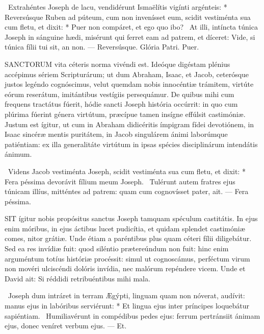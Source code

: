 \R\ Extrahéntes Joseph de lacu, vendidérunt Ismaëlítis vigínti argénteis: * Reversúsque Ruben ad púteum, cum non invenísset eum, scidit vestiménta sua cum fletu, et dixit: * Puer non compáret, et ego quo ibo? \V\ At illi, intíncta túnica Joseph in sánguine hædi, misérunt qui ferret eam ad patrem, et díceret: Vide, si túnica fílii tui sit, an non. --- Reversúsque. Glória Patri. Puer.




\lettrine[lines=2]{S}{ANCTORUM} vita céteris norma vivéndi est. Ideóque digéstam plénius accépimus sériem Scripturárum; ut dum Abraham, Isaac, et Jacob, ceterósque justos legéndo cognóscimus, velut quemdam nobis innocéntiæ trámitem, virtúte eórum reserátum, imitántibus vestígiis persequámur. De quibus mihi cum frequens tractátus fúerit, hódie sancti Joseph história occúrrit: in quo cum plúrima fúerint génera virtútum, præcípue tamen insígne effúlsit castimóniæ. Justum est ígitur, ut cum in Abraham didicéritis ímpigram fídei devotiónem, in Isaac sincéræ mentis puritátem, in Jacob singulárem ánimi laborúmque patiéntiam: ex illa generalitáte virtútum in ipsas spécies disciplinárum intendátis ánimum.

\R\ Videns Jacob vestiménta Joseph, scidit vestiménta sua cum fletu, et dixit: * Fera péssima devorávit fílium meum Joseph. \V\ Tulérunt autem fratres ejus túnicam illíus, mitténtes ad patrem: quam cum cognovísset pater, ait. --- Fera péssima.


\lettrine[lines=2]{S}{IT} ígitur nobis propósitus sanctus Joseph tamquam spéculum castitátis. In ejus enim móribus, in ejus áctibus lucet pudicítia, et quidam splendet castimóniæ comes, nitor grátiæ. Unde étiam a paréntibus plus quam céteri fílii diligebátur. Sed ea res invídiæ fuit: quod siléntio prætereúndum non fuit: hinc enim arguméntum totíus históriæ procéssit: simul ut cognoscámus, perféctum virum non movéri ulciscéndi dolóris invídia, nec malórum repéndere vicem. Unde et David ait: Si réddidi retribuéntibus mihi mala.

\R\ Joseph dum intráret in terram Ægýpti, linguam quam non nóverat, audívit: manus ejus in labóribus serviérunt: * Et lingua ejus inter príncipes loquebátur sapiéntiam. \V\ Humiliavérunt in compédibus pedes ejus: ferrum pertránsiit ánimam ejus, donec veníret verbum ejus. --- Et.

